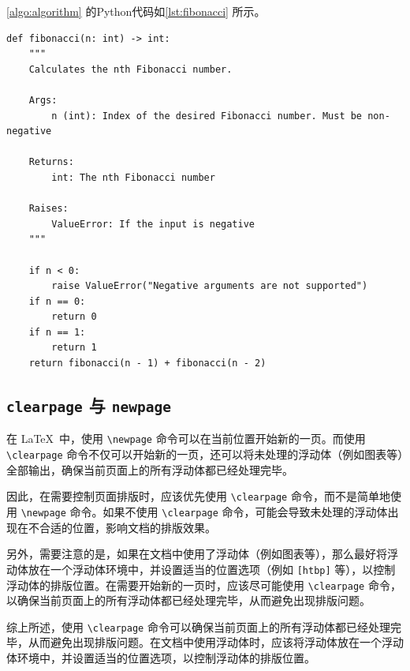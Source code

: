 \cref{algo:algorithm} 的Python代码如\cref{lst:fibonacci} 所示。

\begin{listing}[htbp]
  \begin{verbatim}
def fibonacci(n: int) -> int:
    """
    Calculates the nth Fibonacci number.

    Args:
        n (int): Index of the desired Fibonacci number. Must be non-negative

    Returns:
        int: The nth Fibonacci number

    Raises:
        ValueError: If the input is negative
    """

    if n < 0:
        raise ValueError("Negative arguments are not supported")
    if n == 0:
        return 0
    if n == 1:
        return 1
    return fibonacci(n - 1) + fibonacci(n - 2)
  \end{verbatim}
  \caption{计算斐波那契数列的Python实现}\label{lst:fibonacci}
\end{listing}

\subsection{\texttt{clearpage} 与 \texttt{newpage}}

在 \LaTeX\ 中，使用 \verb|\newpage| 命令可以在当前位置开始新的一页。而使用 \verb|\clearpage| 命令不仅可以开始新的一页，还可以将未处理的浮动体（例如图表等）全部输出，确保当前页面上的所有浮动体都已经处理完毕。

因此，在需要控制页面排版时，应该优先使用 \verb|\clearpage| 命令，而不是简单地使用 \verb|\newpage| 命令。如果不使用 \verb|\clearpage| 命令，可能会导致未处理的浮动体出现在不合适的位置，影响文档的排版效果。

另外，需要注意的是，如果在文档中使用了浮动体（例如图表等），那么最好将浮动体放在一个浮动体环境中，并设置适当的位置选项（例如 \verb|[htbp]| 等），以控制浮动体的排版位置。在需要开始新的一页时，应该尽可能使用 \verb|\clearpage| 命令，以确保当前页面上的所有浮动体都已经处理完毕，从而避免出现排版问题。

综上所述，使用 \verb|\clearpage| 命令可以确保当前页面上的所有浮动体都已经处理完毕，从而避免出现排版问题。在文档中使用浮动体时，应该将浮动体放在一个浮动体环境中，并设置适当的位置选项，以控制浮动体的排版位置。